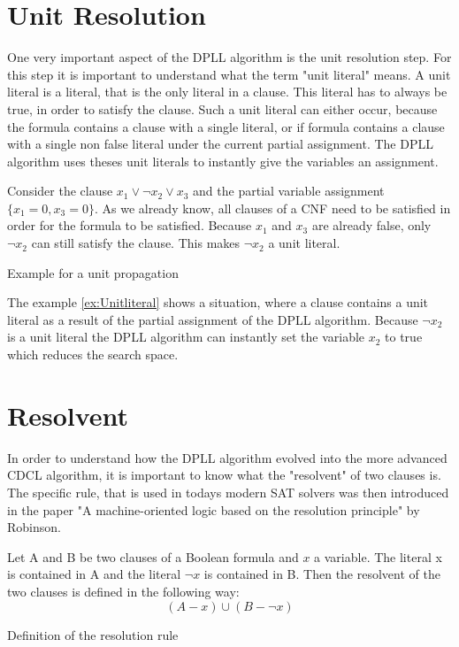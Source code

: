 \section{Unit Resolution}
One very important aspect of the DPLL algorithm is the unit resolution step. For this step it is important to understand what the term "unit literal" means. A unit literal is a literal, that is the only literal in a clause. This literal has to always be true, in order to satisfy the clause. Such a unit literal can either occur, because the formula contains a clause with a single literal, or if formula contains a clause with a single non false literal under the current partial assignment. The DPLL algorithm uses theses unit literals to instantly give the variables an assignment. \cite{biere2009handbook}

\begin{example}
\begin{leftbar}
Consider the clause $x_1 \vee \neg x_2 \vee x_3$ and the partial variable assignment $\{x_1=0,x_3=0\}$. As we already know, all clauses of a CNF need to be satisfied in order for the formula to be satisfied. Because $x_1$ and $x_3$ are already false, only $\neg x_2$ can still satisfy the clause. This makes $\neg x_2$ a unit literal.
\end{leftbar}
\caption{Example for a unit propagation}
\label{ex:Unitliteral}
\end{example}

The example \ref{ex:Unitliteral} shows a situation, where a clause contains a unit literal as a result of the partial assignment of the DPLL algorithm. Because $\neg x_2$ is a unit literal the DPLL algorithm can instantly set the variable $x_2$ to true which reduces the search space.

\section{Resolvent}
In order to understand how the DPLL algorithm evolved into the more advanced CDCL algorithm, it is important to know what the "resolvent" of two clauses is. The specific rule, that is used in todays modern SAT solvers was then introduced in the paper "A machine-oriented logic based on the resolution principle" \cite{robinson1965machine} by Robinson.

\begin{definition}
\begin{leftbar}
Let A and B be two clauses of a Boolean formula and $x$ a variable. The literal x is contained in A and the literal $\neg x$ is contained in B. Then the resolvent of the two clauses is defined in the following way:
\begin{displaymath}
(A - x) \cup (B - \neg x)
\end{displaymath}
\end{leftbar}
\caption{Definition of the resolution rule \cite{robinson1965machine}}
\label{def:Resolution}
\end{definition}

